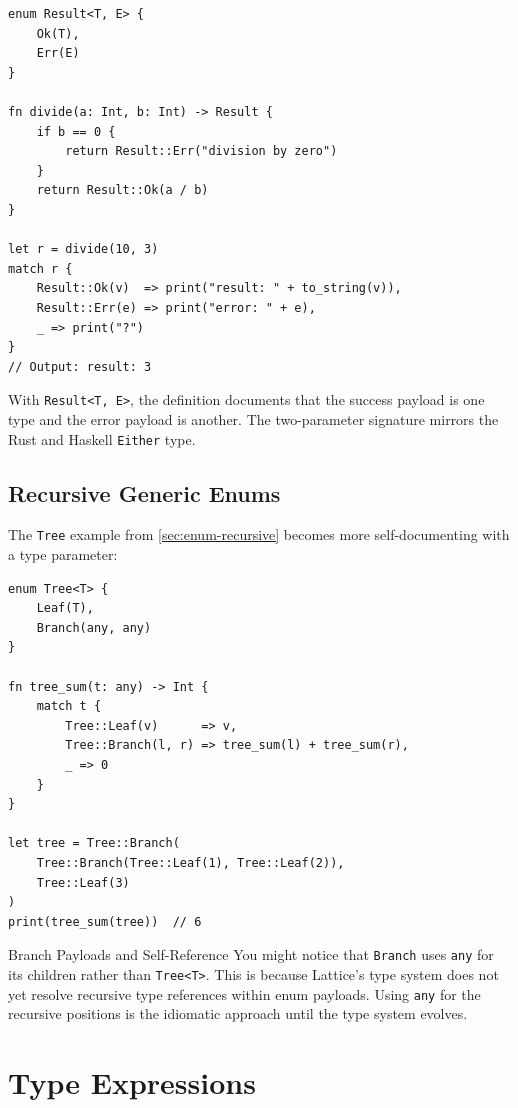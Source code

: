 \begin{lstlisting}[language=Lattice, caption={A generic Result enum}]
enum Result<T, E> {
    Ok(T),
    Err(E)
}

fn divide(a: Int, b: Int) -> Result {
    if b == 0 {
        return Result::Err("division by zero")
    }
    return Result::Ok(a / b)
}

let r = divide(10, 3)
match r {
    Result::Ok(v)  => print("result: " + to_string(v)),
    Result::Err(e) => print("error: " + e),
    _ => print("?")
}
// Output: result: 3
\end{lstlisting}

With \lstinline|Result<T, E>|, the definition documents that the success
payload is one type and the error payload is another. The two-parameter
signature mirrors the Rust and Haskell \texttt{Either} type.

\subsection{Recursive Generic Enums}

The \lstinline|Tree| example from \cref{sec:enum-recursive} becomes more
self-documenting with a type parameter:

\begin{lstlisting}[language=Lattice, caption={A generic binary tree}]
enum Tree<T> {
    Leaf(T),
    Branch(any, any)
}

fn tree_sum(t: any) -> Int {
    match t {
        Tree::Leaf(v)      => v,
        Tree::Branch(l, r) => tree_sum(l) + tree_sum(r),
        _ => 0
    }
}

let tree = Tree::Branch(
    Tree::Branch(Tree::Leaf(1), Tree::Leaf(2)),
    Tree::Leaf(3)
)
print(tree_sum(tree))  // 6
\end{lstlisting}

\begin{notebox}{Branch Payloads and Self-Reference}
You might notice that \lstinline|Branch| uses \lstinline|any| for its
children rather than \lstinline|Tree<T>|. This is because Lattice's type
system does not yet resolve recursive type references within enum payloads.
Using \lstinline|any| for the recursive positions is the idiomatic approach
until the type system evolves.
\end{notebox}

\section{Type Expressions}\label{sec:generics-type-expressions}


